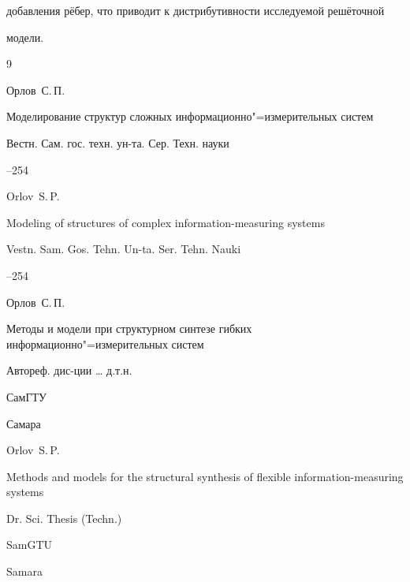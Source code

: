 добавления рёбер, что приводит к дистрибутивности исследуемой решёточной

модели.



\begin{thebibliography}{9}




\by Орлов~С.\,П.

\paper Моделирование структур сложных информационно"=измерительных систем

\jour Вестн. Сам. гос. техн. ун-та. Сер. Техн. науки



--254

\misctransl

\by Orlov~S.\,P.

\paper Modeling of structures of complex information-measuring systems

\jour Vestn. Sam. Gos. Tehn. Un-ta. Ser. Tehn. Nauki



--254








\by Орлов~С.\,П.

\thesis Методы и модели при структурном синтезе гибких информационно"=измерительных систем

\thesisinfo Автореф. дис-ции {\ldots} д.т.н.

\publ СамГТУ

\publaddr Самара



\misctransl

\by Orlov~S.\,P.

\thesis Methods and models for the structural synthesis of flexible information-measuring systems

\thesisinfo Dr. Sci. Thesis (Techn.)

\publ SamGTU

\publaddr Samara







\end{thebibliography}
